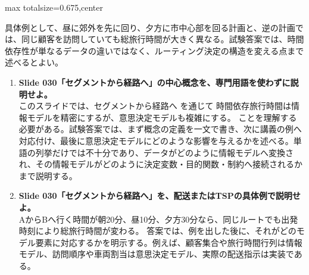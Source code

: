 \begin{adjustbox}{max totalsize={\textwidth}{0.675\textheight},center}
\begin{minipage}{\textwidth}
\begin{minipage}[t]{0.485\textwidth}
具体例として、昼に郊外を先に回り、夕方に市中心部を回る計画と、逆の計画では、同じ顧客を訪問していても総旅行時間が大きく異なる。試験答案では、時間依存性が単なるデータの違いではなく、ルーティング決定の構造を変える点まで述べるとよい。\par
{}
\begin{enumerate}
\item \textbf{Slide 030「セグメントから経路へ」の中心概念を、専門用語を使わずに説明せよ。}\\このスライドでは、セグメントから経路へ を通じて 時間依存旅行時間は情報モデルを精密にするが、意思決定モデルも複雑にする。 ことを理解する必要がある。試験答案では、まず概念の定義を一文で書き、次に講義の例へ対応付け、最後に意思決定モデルにどのような影響を与えるかを述べる。単語の列挙だけでは不十分であり、データがどのように情報モデルへ変換され、その情報モデルがどのように決定変数・目的関数・制約へ接続されるかまで説明する。
\item \textbf{Slide 030「セグメントから経路へ」を、配送またはTSPの具体例で説明せよ。}\\AからBへ行く時間が朝20分、昼10分、夕方30分なら、同じルートでも出発時刻により総旅行時間が変わる。 答案では、例を出した後に、それがどのモデル要素に対応するかを明示する。例えば、顧客集合や旅行時間行列は情報モデル、訪問順序や車両割当は意思決定モデル、実際の配送指示は実装である。
\end{enumerate}
\end{minipage}
\end{minipage}
\end{adjustbox}

